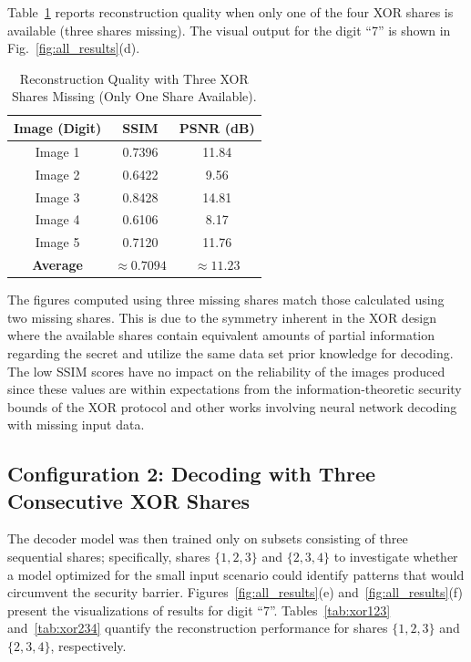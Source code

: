 Table~\ref{tab:xor_miss3} reports reconstruction quality when only one of the
four XOR shares is available (three shares missing). The visual output for the
digit ``7'' is shown in Fig.~\ref{fig:all_results}(d).

\begin{table}[htbp]
\centering
\caption{Reconstruction Quality with Three XOR Shares Missing (Only One Share Available).}
\label{tab:xor_miss3}
\begin{tabular}{|c|c|c|}
\hline
\textbf{Image (Digit)} & \textbf{SSIM} & \textbf{PSNR (dB)} \\
\hline
Image 1   & 0.7396 & 11.84 \\
Image 2   & 0.6422 &  9.56 \\
Image 3   & 0.8428 & 14.81 \\
Image 4   & 0.6106 &  8.17 \\
Image 5   & 0.7120 & 11.76 \\
\hline
\textbf{Average} & $\mathbf{\approx 0.7094}$ & $\mathbf{\approx 11.23}$ \\
\hline
\end{tabular}
\end{table}

The figures computed using three missing shares match those calculated using two
missing shares. This is due to the symmetry inherent in the XOR design where
the available shares contain equivalent amounts of partial information regarding
the secret and utilize the same data set prior knowledge for decoding. The low
SSIM scores have no impact on the reliability of the images produced since
these values are within expectations from the information-theoretic security
bounds of the XOR protocol and other works involving
neural network decoding with missing input data.

\subsection{Configuration 2: Decoding with Three Consecutive XOR Shares}

The decoder model was then trained only on subsets consisting of three sequential
shares; specifically, shares $\{1,2,3\}$ and $\{2,3,4\}$ to investigate whether a model optimized
for the small input scenario could identify patterns that would circumvent the security barrier.
Figures~\ref{fig:all_results}(e) and~\ref{fig:all_results}(f) present the visualizations of results for digit ``7''.
Tables~\ref{tab:xor123} and~\ref{tab:xor234} quantify the reconstruction performance for shares $\{1,2,3\}$ and $\{2,3,4\}$, respectively.


